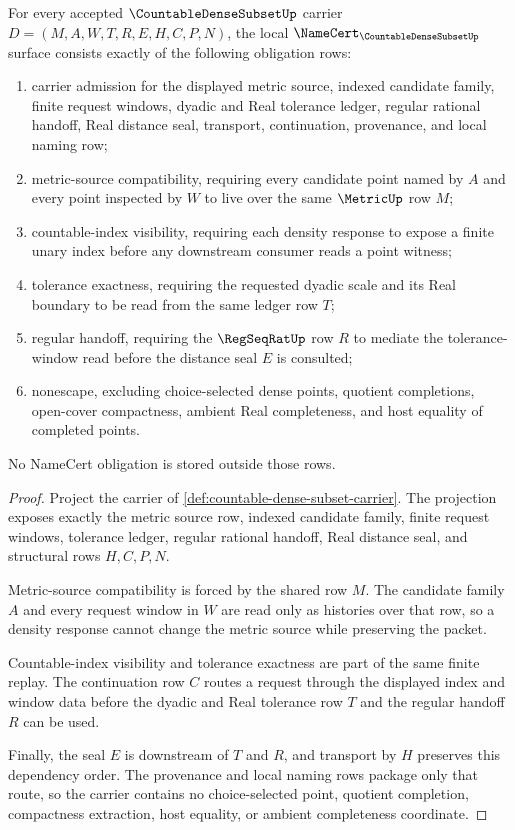 \begin{theorem}
\label{thm:countable-dense-subset-namecert-obligations}
For every accepted $\CountableDenseSubsetUp$ carrier $D=(M,A,W,T,R,E,H,C,P,N)$, the local $\NameCert_{\CountableDenseSubsetUp}$ surface consists exactly of the following obligation rows:
\begin{enumerate}
\item carrier admission for the displayed metric source, indexed candidate family, finite request windows, dyadic and Real tolerance ledger, regular rational handoff, Real distance seal, transport, continuation, provenance, and local naming row;
\item metric-source compatibility, requiring every candidate point named by $A$ and every point inspected by $W$ to live over the same $\MetricUp$ row $M$;
\item countable-index visibility, requiring each density response to expose a finite unary index before any downstream consumer reads a point witness;
\item tolerance exactness, requiring the requested dyadic scale and its Real boundary to be read from the same ledger row $T$;
\item regular handoff, requiring the $\RegSeqRatUp$ row $R$ to mediate the tolerance-window read before the distance seal $E$ is consulted;
\item nonescape, excluding choice-selected dense points, quotient completions, open-cover compactness, ambient Real completeness, and host equality of completed points.
\end{enumerate}
No NameCert obligation is stored outside those rows.
\end{theorem}
\begin{proof}
Project the carrier of \autoref{def:countable-dense-subset-carrier}. The projection exposes exactly the metric source row, indexed candidate family, finite request windows, tolerance ledger, regular rational handoff, Real distance seal, and structural rows $H,C,P,N$.

Metric-source compatibility is forced by the shared row $M$. The candidate family $A$ and every request window in $W$ are read only as histories over that row, so a density response cannot change the metric source while preserving the packet.

Countable-index visibility and tolerance exactness are part of the same finite replay. The continuation row $C$ routes a request through the displayed index and window data before the dyadic and Real tolerance row $T$ and the regular handoff $R$ can be used.

Finally, the seal $E$ is downstream of $T$ and $R$, and transport by $H$ preserves this dependency order. The provenance and local naming rows package only that route, so the carrier contains no choice-selected point, quotient completion, compactness extraction, host equality, or ambient completeness coordinate.
\end{proof}

